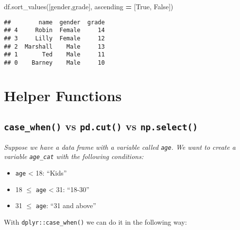 \documentclass[
]{book}
\newenvironment{Shaded}{\begin{snugshade}}{\end{snugshade}}
\newcommand{\NormalTok}[1]{#1}
\newcommand{\OperatorTok}[1]{\textcolor[rgb]{0.81,0.36,0.00}{\textbf{#1}}}
\newcommand{\StringTok}[1]{\textcolor[rgb]{0.31,0.60,0.02}{#1}}
\newcommand{\VariableTok}[1]{\textcolor[rgb]{0.00,0.00,0.00}{#1}}
\begin{document}
\begin{Shaded}
\begin{Highlighting}[]
\NormalTok{df.sort\_values([}\StringTok{\textquotesingle{}gender\textquotesingle{}}\NormalTok{,}\StringTok{\textquotesingle{}grade\textquotesingle{}}\NormalTok{],}
\NormalTok{                ascending }\OperatorTok{=}\NormalTok{ [}\VariableTok{True}\NormalTok{, }\VariableTok{False}\NormalTok{])}
\end{Highlighting}
\end{Shaded}

\begin{verbatim}
##        name  gender  grade
## 4     Robin  Female     14
## 3     Lilly  Female     12
## 2  Marshall    Male     13
## 1       Ted    Male     11
## 0    Barney    Male     10
\end{verbatim}

\hypertarget{helper-functions}{%
\section{Helper Functions}\label{helper-functions}}

\hypertarget{case_when-vs-pd.cut-vs-np.select}{%
\subsection{\texorpdfstring{\texttt{case\_when()} vs \texttt{pd.cut()} vs \texttt{np.select()}}{case\_when() vs pd.cut() vs np.select()}}\label{case_when-vs-pd.cut-vs-np.select}}

\emph{Suppose we have a data frame with a variable called \texttt{age}. We want to create a variable \texttt{age\_cat} with the following conditions:}

\begin{itemize}
\item
  \texttt{age} \textless{} 18: ``Kids''
\item
  18 \(\leq\) \texttt{age} \textless{} 31: ``18-30''
\item
  31 \(\leq\) \texttt{age}: ``31 and above''
\end{itemize}

With \texttt{dplyr::case\_when()} we can do it in the following way:
\end{document}
